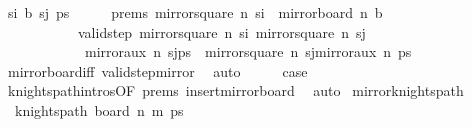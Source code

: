\begin{isabellebody}
\ {\isacharparenleft}{\kern0pt}{}\ s\isactrlsub i\ b\ s\isactrlsub j\ ps{\isacharparenright}{\kern0pt}\isanewline
\ \ \isamarkupfalse%
\ \isamarkupfalse%
\ prems{\isacharcolon}{\kern0pt}\ {\isachardoublequoteopen}mirror{}{\isacharunderscore}{\kern0pt}square\ n\ s\isactrlsub i\ {\isasymnotin}\ mirror{}{\isacharunderscore}{\kern0pt}board\ n\ b{\isachardoublequoteclose}\ \isanewline
\ \ \ \ \ \ \ \ \ \ \ \ {\isachardoublequoteopen}valid{\isacharunderscore}{\kern0pt}step\ {\isacharparenleft}{\kern0pt}mirror{}{\isacharunderscore}{\kern0pt}square\ n\ s\isactrlsub i{\isacharparenright}{\kern0pt}\ {\isacharparenleft}{\kern0pt}mirror{}{\isacharunderscore}{\kern0pt}square\ n\ s\isactrlsub j{\isacharparenright}{\kern0pt}{\isachardoublequoteclose}\ \isanewline
\ \ \ \ \ \ \ \ \ \ \ \ \ {\isachardoublequoteopen}mirror{}{\isacharunderscore}{\kern0pt}aux\ n\ {\isacharparenleft}{\kern0pt}s\isactrlsub j{\isacharhash}{\kern0pt}ps{\isacharparenright}{\kern0pt}\ {\isacharequal}{\kern0pt}\ mirror{}{\isacharunderscore}{\kern0pt}square\ n\ s\isactrlsub j{\isacharhash}{\kern0pt}mirror{}{\isacharunderscore}{\kern0pt}aux\ n\ ps{\isachardoublequoteclose}\isanewline
\ \ \ \ \isamarkupfalse%
\ {}\ mirror{}{\isacharunderscore}{\kern0pt}board{\isacharunderscore}{\kern0pt}iff\ valid{\isacharunderscore}{\kern0pt}step{\isacharunderscore}{\kern0pt}mirror{}\ \isamarkupfalse%
\ auto\isanewline
\ \ \isamarkupfalse%
\ \isamarkupfalse%
\ {\isacharquery}{\kern0pt}case\ \isanewline
\ \ \ \ \isamarkupfalse%
\ {}\ knights{\isacharunderscore}{\kern0pt}path{\isachardot}{\kern0pt}intros{\isacharparenleft}{\kern0pt}{}{\isacharparenright}{\kern0pt}{\isacharbrackleft}{\kern0pt}OF\ prems{\isacharbrackright}{\kern0pt}\ insert{\isacharunderscore}{\kern0pt}mirror{}{\isacharunderscore}{\kern0pt}board\ \isamarkupfalse%
\ auto\isanewline
{}\isamarkupfalse%
%
\endisatagproof
{\isafoldproof}%
%
\isadelimproof
\isanewline
%
\endisadelimproof
\isanewline
{}\isamarkupfalse%
\ mirror{}{\isacharunderscore}{\kern0pt}knights{\isacharunderscore}{\kern0pt}path{\isacharcolon}{\kern0pt}\isanewline
\ \ \ {\isachardoublequoteopen}knights{\isacharunderscore}{\kern0pt}path\ {\isacharparenleft}{\kern0pt}board\ n\ m{\isacharparenright}{\kern0pt}\ ps{\isachardoublequoteclose}\ \isanewline

\end{isabellebody}
